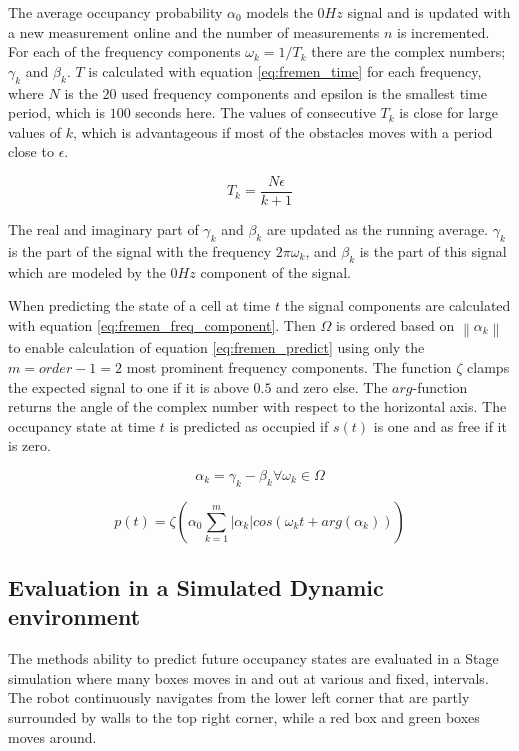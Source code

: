 The average occupancy probability $\alpha_0$ models the $0Hz$ signal and is updated with a new measurement online and the number of measurements $n$ is incremented. 
For each of the frequency components $\omega_k=1/T_k$ there are the complex numbers; $\gamma_k$ and $\beta_k$.
$T$ is calculated with equation \ref{eq:fremen_time} for each frequency, where $N$ is the $20$ used frequency components and epsilon is the smallest time period, which is $100$ seconds here. 
The values of consecutive $T_k$ is close for large values of $k$, which is advantageous if most of the obstacles moves with a period close to $\epsilon$.

\begin{equation}
T_k = \frac{N \epsilon}{k+1}
\label{eq:fremen_time}
\end{equation}

The real and imaginary part of $\gamma_k$ and $\beta_k$ are updated as the running average. $\gamma_k$ is the part of the signal with the frequency $2 \pi \omega_k$, and $\beta_k$ is the part of this signal which are modeled by the $0Hz$ component of the signal.

When predicting the state of a cell at time $t$ the signal components are calculated with equation \ref{eq:fremen_freq_component}.
Then $ \Omega $ is ordered based on $ \left\| \alpha_k \right\| $ to enable calculation of equation \ref{eq:fremen_predict} using only the $m=order-1=2$ most prominent frequency components.
The function $\zeta$ clamps the expected signal to one if it is above $0.5$ and zero else. The $arg$-function returns the angle of the complex number with respect to the horizontal axis.
The occupancy state at time $t$ is predicted as occupied if $s(t)$ is one and as free if it is zero.

\begin{equation}
\alpha_k = \gamma_k - \beta_k \forall \omega_k \in \Omega
\label{eq:fremen_freq_component}
\end{equation}

\begin{equation}
p(t) = \zeta \left( \alpha_0 \sum_{k=1}^{m} |\alpha_k| cos(\omega_k t + arg(\alpha_k))  \right)
\label{eq:fremen_predict}
\end{equation}

\subsection{Evaluation in a Simulated Dynamic environment}
The methods ability to predict future occupancy states are evaluated in a Stage simulation where many boxes moves in and out at various and fixed, intervals. 
The robot continuously navigates from the lower left corner that are partly surrounded by walls to the top right corner, while a red box and green boxes moves around.

